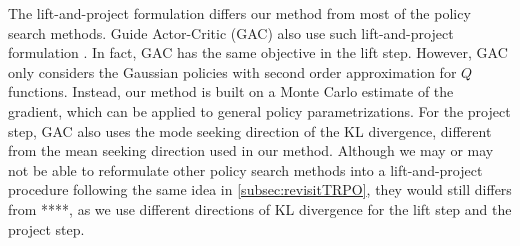 
The lift-and-project formulation differs our method from most of the policy search methods. 
Guide Actor-Critic (GAC) also use such lift-and-project formulation \citet{tangkaratt2017guide}. In fact, GAC has the same objective in the lift step. 
However, GAC only considers the Gaussian policies with second order approximation for $Q$ functions.
Instead, our method is built on a Monte Carlo estimate of the gradient, which can be applied to general policy parametrizations. For the project step, GAC also uses the mode seeking direction of the KL divergence, different from the mean seeking direction used in our method.  
Although we may or may not be able to reformulate other policy search methods into a lift-and-project procedure following the same idea in \cref{subsec:revisitTRPO},
they would still differs from ****, as we use different directions of KL divergence for the lift step and the project step. 

